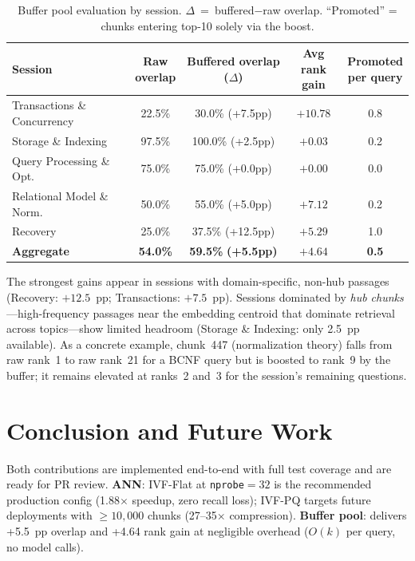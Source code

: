 \documentclass[11pt,letterpaper]{article}
\begin{document}
\begin{table}[H]
\centering
\caption{Buffer pool evaluation by session. $\Delta$~=~buffered$-$raw overlap. ``Promoted'' = chunks entering top-10 solely via the boost.}
\label{tab:buffer_sessions}
\setlength{\tabcolsep}{5pt}
\begin{tabular}{lcccc}
\toprule
Session &
  \shortstack{Raw\\overlap} &
  \shortstack{Buffered\\overlap ($\Delta$)} &
  \shortstack{Avg rank\\gain} &
  \shortstack{Promoted\\per query} \\
\midrule
Transactions \& Concurrency & 22.5\% & 30.0\% \scriptsize{(+7.5pp)}  & $+10.78$ & 0.8 \\
Storage \& Indexing         & 97.5\% & 100.0\% \scriptsize{(+2.5pp)} & $+0.03$  & 0.2 \\
Query Processing \& Opt.    & 75.0\% & 75.0\% \scriptsize{(+0.0pp)}  & $+0.00$  & 0.0 \\
Relational Model \& Norm.   & 50.0\% & 55.0\% \scriptsize{(+5.0pp)}  & $+7.12$  & 0.2 \\
Recovery                    & 25.0\% & 37.5\% \scriptsize{(+12.5pp)} & $+5.29$  & 1.0 \\
\midrule
\textbf{Aggregate}          & \textbf{54.0\%} & \textbf{59.5\%} \scriptsize{\textbf{(+5.5pp)}} & $\mathbf{+4.64}$ & \textbf{0.5} \\
\bottomrule
\end{tabular}
\end{table}

The strongest gains appear in sessions with domain-specific, non-hub passages
(Recovery: $+12.5$~pp; Transactions: $+7.5$~pp).  Sessions dominated by
\emph{hub chunks}---high-frequency passages near the embedding centroid that
dominate retrieval across topics---show limited headroom (Storage \& Indexing:
only 2.5~pp available).  As a concrete example, chunk~447 (normalization theory)
falls from raw rank~1 to raw rank~21 for a BCNF query but is boosted to rank~9
by the buffer; it remains elevated at ranks~2 and~3 for the session's remaining
questions.

\section{Conclusion and Future Work}

Both contributions are implemented end-to-end with full test coverage and are
ready for PR review.  \textbf{ANN}: IVF-Flat at \texttt{nprobe}$=32$ is the
recommended production config (1.88$\times$ speedup, zero recall loss); IVF-PQ
targets future deployments with $\geq\!10{,}000$ chunks (27--35$\times$
compression).  \textbf{Buffer pool}: delivers +5.5~pp overlap and +4.64 rank
gain at negligible overhead ($O(k)$ per query, no model calls).
\end{document}
